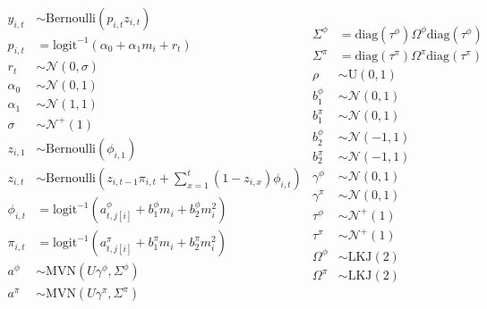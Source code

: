 \documentclass[12pt,letterpaper]{article}
\begin{document}
\begin{equation}
  \begin{split}
    y_{i, t} &\sim \text{Bernoulli}(p_{i, t} z_{i, t}) \\
    p_{i, t} &= \text{logit}^{-1}(\alpha_{0} + \alpha_{1} m_{i} + r_{t}) \\ 
    r_{t} &\sim \mathcal{N}(0, \sigma) \\
    \alpha_{0} &\sim \mathcal{N}(0, 1) \\
    \alpha_{1} &\sim \mathcal{N}(1, 1) \\
    \sigma &\sim \mathcal{N}^{+}(1) \\
    z_{i, 1} &\sim \text{Bernoulli}(\phi_{i, 1}) \\
    z_{i, t} &\sim \text{Bernoulli}\left(z_{i, t - 1} \pi_{i,t} + \sum_{x = 1}^{t}(1 - z_{i, x}) \phi_{i,t}\right) \\
    \phi_{i, t} &= \text{logit}^{-1}(a^{\phi}_{t, j[i]} + b^{\phi}_{1} m_{i} + b^{\phi}_{2} m_{i}^{2}) \\
    \pi_{i, t} &= \text{logit}^{-1}(a^{\pi}_{t, j[i]} + b^{\pi}_{1} m_{i} + b^{\pi}_{2} m_{i}^{2}) \\
    a^{\phi} &\sim \text{MVN}(U \gamma^{\phi}, \Sigma^{\phi}) \\
    a^{\pi} &\sim \text{MVN}(U \gamma^{\pi}, \Sigma^{\pi}) \\
  \end{split}
  \begin{split}
    \Sigma^{\phi} &= \text{diag}(\tau^{\phi}) \Omega^{\phi} \text{diag}(\tau^{\phi}) \\
    \Sigma^{\pi} &= \text{diag}(\tau^{\pi}) \Omega^{\pi} \text{diag}(\tau^{\pi}) \\
    \rho &\sim \text{U}(0, 1) \\
    b^{\phi}_{1} &\sim \mathcal{N}(0, 1) \\
    b^{\pi}_{1} &\sim \mathcal{N}(0, 1) \\
    b^{\phi}_{2} &\sim \mathcal{N}(-1, 1) \\
    b^{\pi}_{2} &\sim \mathcal{N}(-1, 1) \\
    \gamma^{\phi} &\sim \mathcal{N}(0, 1) \\
    \gamma^{\pi} &\sim \mathcal{N}(0, 1) \\
    \tau^{\phi} &\sim \mathcal{N}^{+}(1) \\
    \tau^{\pi} &\sim \mathcal{N}^{+}(1) \\
    \Omega^{\phi} &\sim \text{LKJ}(2) \\
    \Omega^{\pi} &\sim \text{LKJ}(2) \\
  \end{split}
  \label{eq:birth_death}
\end{equation}
\end{document}
